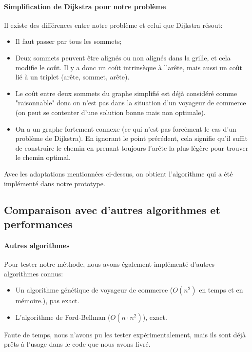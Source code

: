 \paragraph{Simplification de Dijkstra pour notre problème}
Il existe des différences entre notre problème et celui que Dijkstra résout:
\begin{itemize}
	\item Il faut passer par tous les sommets;
	\item Deux sommets peuvent être alignés ou non alignés dans la grille, et cela modifie le coût. Il y a donc un coût intrinsèque à l'arête, mais aussi un coût lié à un triplet (arête, sommet, arête).
	\item Le coût entre deux sommets du graphe simplifié est déjà considéré comme "raisonnable" donc on n'est pas dans la situation d'un voyageur de commerce (on peut se contenter d'une solution bonne mais non optimale).
	\item On a un graphe fortement connexe (ce qui n'est pas forcément le cas d'un problème de Dijkstra). En ignorant le point précédent, cela signifie qu'il suffit de construire le chemin en prenant toujours l'arête la plus légère pour trouver le chemin optimal.
\end{itemize}
Avec les adaptations mentionnées ci-dessus, on obtient l'algorithme qui a été implémenté dans notre prototype.
\subsection{Comparaison avec d'autres algorithmes et performances}
\paragraph{Autres algorithmes}
Pour tester notre méthode, nous avons également implémenté d'autres algorithmes connus:
\begin{itemize}
	\item Un algorithme génétique de voyageur de commerce ($O(n^2)$ en temps et en mémoire.), pas exact.
	\item L'algorithme de Ford-Bellman ($O(n \cdot n^2)$), exact.
\end{itemize}
Faute de temps, nous n'avons pu les tester expérimentalement, mais ils sont déjà prêts à l'usage dans le code que nous avons livré.
